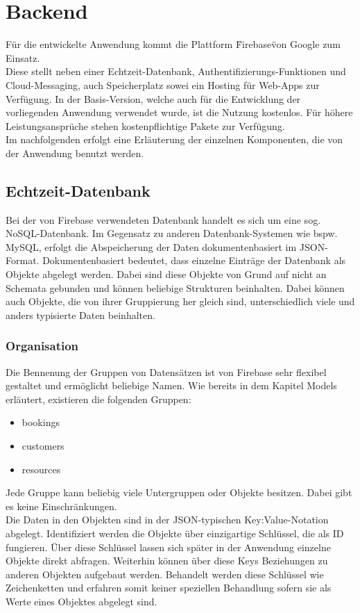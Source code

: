 \section{Backend}
Für die entwickelte Anwendung kommt die Plattform \"Firebase\" von Google zum Einsatz.
\\
Diese stellt neben einer Echtzeit-Datenbank, Authentifizierungs-Funktionen und Cloud-Messaging, auch Speicherplatz sowei ein Hosting für Web-Apps zur Verfügung.
In der Basis-Version, welche auch für die Entwicklung der vorliegenden Anwendung verwendet wurde, ist die Nutzung kostenlos. Für höhere Leistungsansprüche stehen kostenpflichtige Pakete zur Verfügung.\\
Im nachfolgenden erfolgt eine Erläuterung der einzelnen Komponenten, die von der Anwendung benutzt werden.

\subsection{Echtzeit-Datenbank}
Bei der von Firebase verwendeten Datenbank handelt es sich um eine sog. NoSQL-Datenbank. Im Gegensatz zu anderen Datenbank-Systemen wie bspw. MySQL, erfolgt die Abspeicherung der Daten dokumentenbasiert im JSON-Format.
Dokumentenbasiert bedeutet, dass einzelne Einträge der Datenbank als Objekte abgelegt werden. Dabei sind diese Objekte von Grund auf nicht an Schemata gebunden und können beliebige Strukturen beinhalten.
Dabei können auch Objekte, die von ihrer Gruppierung her gleich sind, unterschiedlich viele und anders typisierte Daten beinhalten.\\


\subsubsection{Organisation}
Die Bennenung der Gruppen von Datensätzen ist von Firebase sehr flexibel gestaltet und ermöglicht beliebige Namen.
Wie bereits in dem Kapitel Models erläutert, existieren die folgenden Gruppen:
\begin{itemize}
\item bookings
\item customers
\item resources
\end{itemize}
Jede Gruppe kann beliebig viele Untergruppen oder Objekte besitzen. Dabei gibt es keine Einschränkungen.\\
Die Daten in den Objekten sind in der JSON-typischen Key:Value-Notation abgelegt.
Identifiziert werden die Objekte über einzigartige Schlüssel, die als ID fungieren.
Über diese Schlüssel lassen sich später in der Anwendung einzelne Objekte direkt abfragen.
Weiterhin können über diese Keys Beziehungen zu anderen Objekten aufgebaut werden.
Behandelt werden diese Schlüssel wie Zeichenketten und erfahren somit keiner speziellen Behandlung sofern sie als Werte eines Objektes abgelegt sind.


